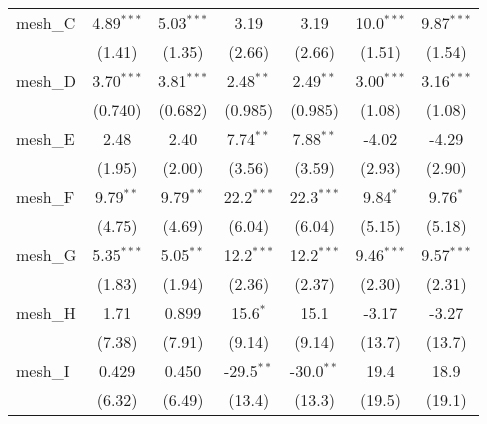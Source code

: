 \begin{tabular}{lcccccc}
   mesh\_C                                                     & 4.89$^{***}$  & 5.03$^{***}$  & 3.19          & 3.19          & 10.0$^{***}$  & 9.87$^{***}$\\   
                                                               & (1.41)        & (1.35)        & (2.66)        & (2.66)        & (1.51)        & (1.54)\\   
   mesh\_D                                                     & 3.70$^{***}$  & 3.81$^{***}$  & 2.48$^{**}$   & 2.49$^{**}$   & 3.00$^{***}$  & 3.16$^{***}$\\   
                                                               & (0.740)       & (0.682)       & (0.985)       & (0.985)       & (1.08)        & (1.08)\\   
   mesh\_E                                                     & 2.48          & 2.40          & 7.74$^{**}$   & 7.88$^{**}$   & -4.02         & -4.29\\   
                                                               & (1.95)        & (2.00)        & (3.56)        & (3.59)        & (2.93)        & (2.90)\\   
   mesh\_F                                                     & 9.79$^{**}$   & 9.79$^{**}$   & 22.2$^{***}$  & 22.3$^{***}$  & 9.84$^{*}$    & 9.76$^{*}$\\   
                                                               & (4.75)        & (4.69)        & (6.04)        & (6.04)        & (5.15)        & (5.18)\\   
   mesh\_G                                                     & 5.35$^{***}$  & 5.05$^{**}$   & 12.2$^{***}$  & 12.2$^{***}$  & 9.46$^{***}$  & 9.57$^{***}$\\   
                                                               & (1.83)        & (1.94)        & (2.36)        & (2.37)        & (2.30)        & (2.31)\\   
   mesh\_H                                                     & 1.71          & 0.899         & 15.6$^{*}$    & 15.1          & -3.17         & -3.27\\   
                                                               & (7.38)        & (7.91)        & (9.14)        & (9.14)        & (13.7)        & (13.7)\\   
   mesh\_I                                                     & 0.429         & 0.450         & -29.5$^{**}$  & -30.0$^{**}$  & 19.4          & 18.9\\   
                                                               & (6.32)        & (6.49)        & (13.4)        & (13.3)        & (19.5)        & (19.1)\\   

\end{tabular}

